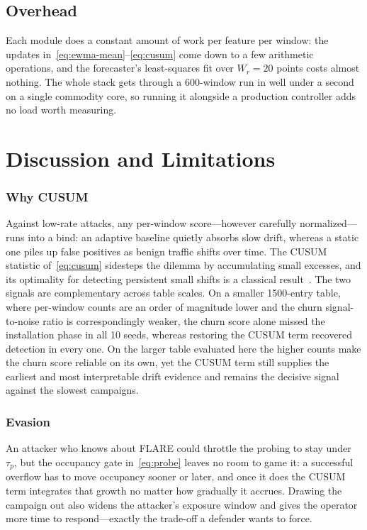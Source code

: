 \documentclass[conference]{IEEEtran}
\begin{document}
\subsection{Overhead}
Each module does a constant amount of work per feature per window: the updates
in~\eqref{eq:ewma-mean}--\eqref{eq:cusum} come down to a few arithmetic
operations, and the forecaster's least-squares fit over $W_r = 20$ points costs
almost nothing. The whole stack gets through a 600-window run in well under a
second on a single commodity core, so running it alongside a production
controller adds no load worth measuring.

\section{Discussion and Limitations}\label{sec:discussion}
\subsubsection{Why CUSUM} Against low-rate attacks, any per-window
score---however carefully normalized---runs into a bind: an adaptive baseline
quietly absorbs slow drift, whereas a static one piles up false positives as
benign traffic shifts over time. The CUSUM statistic of~\eqref{eq:cusum}
sidesteps the dilemma by accumulating small excesses, and its optimality for
detecting persistent small shifts is a classical result~\cite{page1954cusum}.
The two signals are complementary across table scales. On a smaller
1500-entry table, where per-window counts are an order of magnitude lower and
the churn signal-to-noise ratio is correspondingly weaker, the churn score
alone missed the installation phase in all 10 seeds, whereas restoring the
CUSUM term recovered detection in every one. On the larger table evaluated
here the higher counts make the churn score reliable on its own, yet the CUSUM
term still supplies the earliest and most interpretable drift evidence and
remains the decisive signal against the slowest campaigns.

\subsubsection{Evasion} An attacker who knows about FLARE could throttle the
probing to stay under $\tau_p$, but the occupancy gate in~\eqref{eq:probe}
leaves no room to game it: a successful overflow has to move occupancy sooner or
later, and once it does the CUSUM term integrates that growth no matter how
gradually it accrues. Drawing the campaign out also widens the attacker's
exposure window and gives the operator more time to respond---exactly the
trade-off a defender wants to force.
\end{document}
